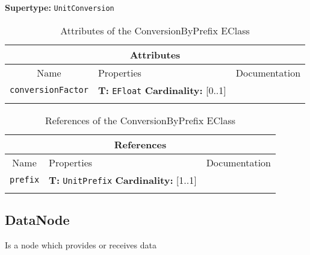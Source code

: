 \documentclass{article}
\begin{document}
\textbf{Supertype: }\texttt{UnitConversion}
\begin{table}[H]
\footnotesize
\begin{tabularx}{\textwidth}{|c| p{4 cm} | X |}
\hline
\multicolumn{3}{|c|}{\textbf{Attributes}} \\
\hline
Name & Properties & Documentation \\ \hline \hline
\texttt{conversionFactor}
 & 
\textbf{T:} \texttt{EFloat}
\newline
\textbf{Cardinality:} [0..1]
 & \\ \hline
\caption{Attributes of the ConversionByPrefix EClass}
\end{tabularx}
\label{e4smConversionByPrefixattr}
\end{table}
\begin{table}[H]
\footnotesize
\begin{tabularx}{\textwidth}{|c| p{4 cm} | X |}
\hline
\multicolumn{3}{|c|}{\textbf{References}} \\
\hline
Name & Properties & Documentation \\ \hline \hline
\texttt{prefix}
 & 
\textbf{T:} \texttt{UnitPrefix}
\newline
\textbf{Cardinality:} [1..1]
 & \\ \hline
\caption{References of the ConversionByPrefix EClass}
\end{tabularx}
\label{e4smConversionByPrefixref}
\end{table}
\subsection[DataNode]{DataNode}
\label{e4smDataNode}

Is a node which provides or receives data
\end{document}
